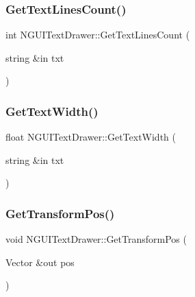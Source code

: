 \hypertarget{class_n_g_u_i_text_drawer_ae02166d5e1efd5a139812cde629eaf7c}{}\label{class_n_g_u_i_text_drawer_ae02166d5e1efd5a139812cde629eaf7c} 
\subsubsection{\texorpdfstring{Get\+Text\+Lines\+Count()}{GetTextLinesCount()}}
{\footnotesize\ttfamily int N\+G\+U\+I\+Text\+Drawer\+::\+Get\+Text\+Lines\+Count (\begin{DoxyParamCaption}\item[{string \&in}]{txt }\end{DoxyParamCaption})}

\hypertarget{class_n_g_u_i_text_drawer_aba3836d78e53e64f3700a50d3d5bd955}{}\label{class_n_g_u_i_text_drawer_aba3836d78e53e64f3700a50d3d5bd955} 
\subsubsection{\texorpdfstring{Get\+Text\+Width()}{GetTextWidth()}}
{\footnotesize\ttfamily float N\+G\+U\+I\+Text\+Drawer\+::\+Get\+Text\+Width (\begin{DoxyParamCaption}\item[{string \&in}]{txt }\end{DoxyParamCaption})}

\hypertarget{class_n_g_u_i_text_drawer_aea82a7429de25bffcbfb2eb6abba3961}{}\label{class_n_g_u_i_text_drawer_aea82a7429de25bffcbfb2eb6abba3961} 
\subsubsection{\texorpdfstring{Get\+Transform\+Pos()}{GetTransformPos()}}
{\footnotesize\ttfamily void N\+G\+U\+I\+Text\+Drawer\+::\+Get\+Transform\+Pos (\begin{DoxyParamCaption}\item[{Vector \&out}]{pos }\end{DoxyParamCaption})}

